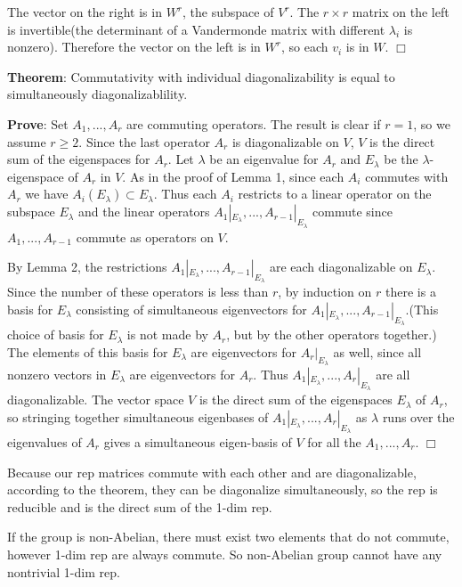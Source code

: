 \documentclass[]{ctexart}
\begin{document}
			The vector on the right is in $W^r$, the subspace of $V^r$. The $r\times r$ matrix on the left is invertible(the determinant of a Vandermonde matrix with different $\lambda_i$ is nonzero). Therefore the vector on the left is in $W^r$, so each $v_i$ is in $W$. \qquad $\Box$
		
			\textbf{Theorem}: Commutativity with individual diagonalizability is equal to  simultaneously  diagonalizablility. 
		
			\textbf{Prove}: Set $A_1,...,A_r$ are commuting operators. The result is clear if $ r= 1 $, so we assume $ r\geq 2 $. Since the last operator $ A_r $ is diagonalizable on $ V $, $ V $ is the direct sum of the eigenspaces for $ A_r $.  Let $ \lambda $ be an eigenvalue for $ A_r $ and $E_{\lambda}$ be the $ \lambda $-eigenspace of $ A_r $ in $ V $.  As in the proof of Lemma 1, since each $ A_i $ commutes with $ A_r $ we have $A_i(E_{\lambda})\subset E_{\lambda}$.  Thus each $ A_i $ restricts to a linear operator on the subspace $ E_{\lambda} $ and the linear operators $ A_1|_{E_{\lambda}},...,A_{r−1}|_{E_{\lambda}} $ commute since $ A_1,...,A_{r−1} $ commute as operators on $ V $.
		
			By Lemma 2, the restrictions $ A_1|_{E_{\lambda}},...,A_{r−1}|_{E_{\lambda}} $ are each diagonalizable on $E_{\lambda}$. Since the number of these  operators is less  than $ r $, by induction on $ r $ there  is  a  basis  for $E_{\lambda}$ consisting of simultaneous eigenvectors for $ A_1|_{E_{\lambda}},...,A_{r−1}|_{E_{\lambda}} $.(This choice of basis for $E_{\lambda}$ is not made by $ A_r $, but by the other operators together.) The elements of this basis for $E_{\lambda}$ are eigenvectors for $A_{r}|_{E_{\lambda}} $ as well, since all nonzero vectors in $E_{\lambda}$ are eigenvectors for $A_r$.  Thus $ A_1|_{E_{\lambda}},...,A_{r}|_{E_{\lambda}} $ are all diagonalizable. The vector space $ V $ is the direct sum of the eigenspaces $E_{\lambda}$ of $ A_r $,  so stringing together simultaneous eigenbases of $ A_1|_{E_{\lambda}},...,A_{r}|_{E_{\lambda}} $ as $\lambda$ runs over the eigenvalues of $ A_r $ gives a simultaneous eigen-basis of $ V $ for all the $ A_1,...,A_r $. \qquad $\Box$
		
			Because our rep matrices commute with each other and are diagonalizable, according to the theorem, they can be diagonalize simultaneously, so the rep is reducible and is the direct sum of the 1-dim rep. 
		
		If the group is non-Abelian, there must exist two elements that do not commute, however 1-dim rep are always commute. So non-Abelian group cannot have any nontrivial 1-dim rep.
			
\end{document}
